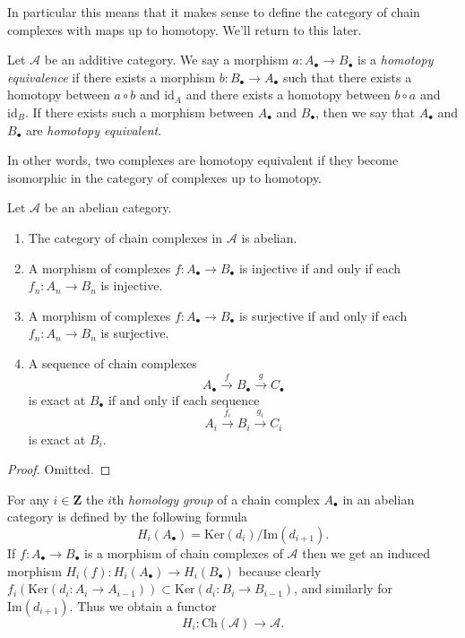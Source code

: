 \noindent
In particular this means that it makes sense to define
the category of chain complexes with maps up to homotopy.
We'll return to this later.

\begin{definition}
\label{definition-homotopy-equivalent}
Let $\mathcal{A}$ be an additive category.
We say a morphism $a : A_\bullet \to B_\bullet$
is a {\it homotopy equivalence} if there exists
a morphism $b : B_\bullet \to A_\bullet$
such that there exists a homotopy between
$a \circ b$ and $\text{id}_A$
and there exists a homotopy between $b \circ a$ and $\text{id}_B$.
If there exists such a morphism between $A_\bullet$ and $B_\bullet$, then
we say that $A_\bullet$ and $B_\bullet$ are {\it homotopy equivalent}.
\end{definition}

\noindent
In other words, two complexes are homotopy equivalent if they become
isomorphic in the category of complexes up to homotopy.

\begin{lemma}
\label{lemma-cat-chain-abelian}
Let $\mathcal{A}$ be an abelian category.
\begin{enumerate}
\item The category of chain complexes in $\mathcal{A}$ is
abelian.
\item A morphism of complexes
$f : A_\bullet \to B_\bullet$ is injective
if and only if each $f_n : A_n \to B_n$ is injective.
\item A morphism of complexes
$f : A_\bullet \to B_\bullet$ is surjective
if and only if each $f_n : A_n \to B_n$ is surjective.
\item A sequence of chain complexes
$$
A_\bullet \xrightarrow{f} B_\bullet \xrightarrow{g} C_\bullet
$$
is exact at $B_\bullet$ if and only if each sequence
$$
A_i \xrightarrow{f_i} B_i \xrightarrow{g_i} C_i
$$
is exact at $B_i$.
\end{enumerate}
\end{lemma}

\begin{proof}
Omitted.
\end{proof}

\noindent
For any $i \in \mathbf{Z}$ the $i$th {\it homology group}
of a chain complex $A_\bullet$ in an abelian category is defined by
the following formula
$$
H_i(A_\bullet) = \text{Ker}(d_i)/\text{Im}(d_{i + 1}).
$$
If $f : A_\bullet \to B_\bullet$ is a morphism of chain
complexes of $\mathcal{A}$ then we get an induced
morphism $H_i(f) : H_i(A_\bullet) \to H_i(B_\bullet)$
because clearly
$f_i(\text{Ker}(d_i : A_i \to A_{i - 1})) \subset
\text{Ker}(d_i : B_i \to B_{i - 1})$, and similarly
for $\text{Im}(d_{i + 1})$.
Thus we obtain a functor
$$
H_i : \text{Ch}(\mathcal{A}) \longrightarrow \mathcal{A}.
$$

